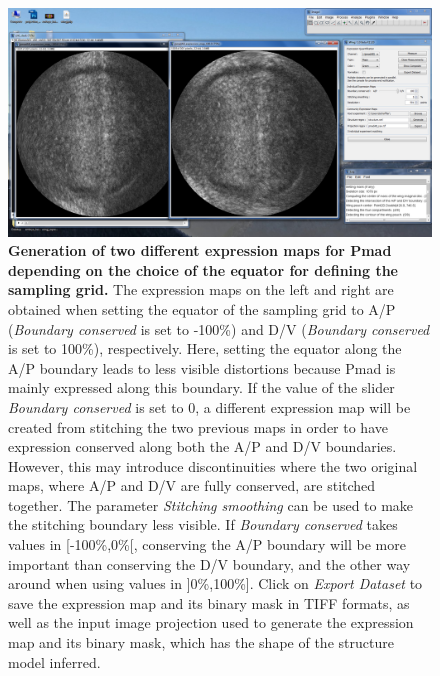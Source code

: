 \begin{figure}[!h]
\centering
\includegraphics[scale=0.215]{images/wingj_expression_maps_preview.jpg}
\caption{\textbf{Generation of two different expression maps for Pmad depending on the choice of the equator for defining the sampling grid.} The expression maps on the left and right are obtained when setting the equator of the sampling grid to A/P (\textit{Boundary conserved} is set to -100\%) and D/V (\textit{Boundary conserved} is set to 100\%), respectively. Here, setting the equator along the A/P boundary leads to less visible distortions because Pmad is mainly expressed along this boundary. If the value of the slider \textit{Boundary conserved} is set to 0, a different expression map will be created from stitching the two previous maps in order to have expression conserved along both the A/P and D/V boundaries. However, this may introduce discontinuities where the two original maps, where A/P and D/V are fully conserved, are stitched together. The parameter \textit{Stitching smoothing} can be used to make the stitching boundary less visible. If \textit{Boundary conserved} takes values in [-100\%,0\%[, conserving the A/P boundary will be more important than conserving the D/V boundary, and the other way around when using values in ]0\%,100\%]. Click on \textit{Export Dataset} to save the expression map and its binary mask in TIFF formats, as well as the input image projection used to generate the expression map and its binary mask, which has the shape of the structure model inferred.}
\label{fig:wingj_expression_maps_preview}
\end{figure}

